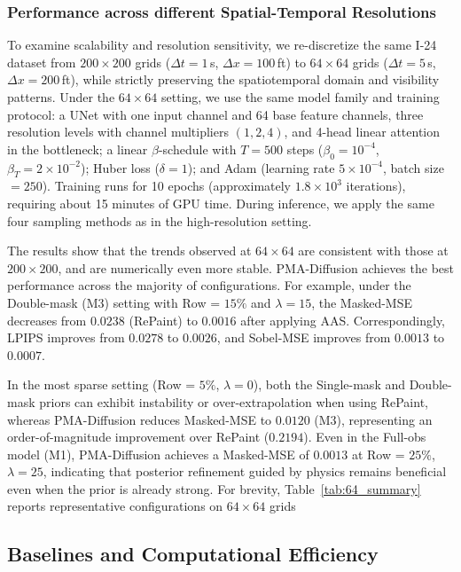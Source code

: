 \documentclass[a4paper,fleqn]{cas-sc}
\numberwithin{equation}{section}
\begin{document}
\subsubsection{Performance across different Spatial-Temporal Resolutions}
To examine scalability and resolution sensitivity, we re-discretize the same I-24 dataset from $200{\times}200$ grids ($\Delta t{=}1$\,s, $\Delta x{=}100$\,ft) to $64{\times}64$ grids ($\Delta t{=}5$\,s, $\Delta x{=}200$\,ft), while strictly preserving the spatiotemporal domain and visibility patterns. 
Under the $64{\times}64$ setting, we use the same model family and training protocol: a UNet with one input channel and 64 base feature channels, three resolution levels with channel multipliers $(1,2,4)$, and 4-head linear attention in the bottleneck; a linear $\beta$-schedule with $T{=}500$ steps ($\beta_0{=}10^{-4}$, $\beta_T{=}2{\times}10^{-2}$); Huber loss ($\delta{=}1$); and Adam (learning rate $5{\times}10^{-4}$, batch size $=250$). Training runs for 10 epochs (approximately $1.8\times10^{3}$ iterations), requiring about 15 minutes of GPU time. During inference, we apply the same four sampling methods as in the high-resolution setting.

The results show that the trends observed at $64{\times}64$ are consistent with those at $200{\times}200$, and are numerically even more stable. PMA-Diffusion achieves the best performance across the majority of configurations. For example, under the Double-mask (M3) setting with Row = $15\%$ and $\lambda = 15$, the Masked-MSE decreases from $0.0238$ (RePaint) to $0.0016$ after applying AAS. Correspondingly, LPIPS improves from $0.0278$ to $0.0026$, and Sobel-MSE improves from $0.0013$ to $0.0007$. 

In the most sparse setting (Row = $5\%$, $\lambda = 0$), both the Single-mask and Double-mask priors can exhibit instability or over-extrapolation when using RePaint, whereas PMA-Diffusion reduces Masked-MSE to $0.0120$ (M3), representing an order-of-magnitude improvement over RePaint ($0.2194$). Even in the Full-obs model (M1), PMA-Diffusion achieves a Masked-MSE of $0.0013$ at Row = $25\%$, $\lambda = 25$, indicating that posterior refinement guided by physics remains beneficial even when the prior is already strong. For brevity, Table~\ref{tab:64_summary} reports representative configurations on $64{\times}64$ grids

\subsection{Baselines and Computational Efficiency}
\label{sec:exp_baseline_efficiency}
\end{document}
